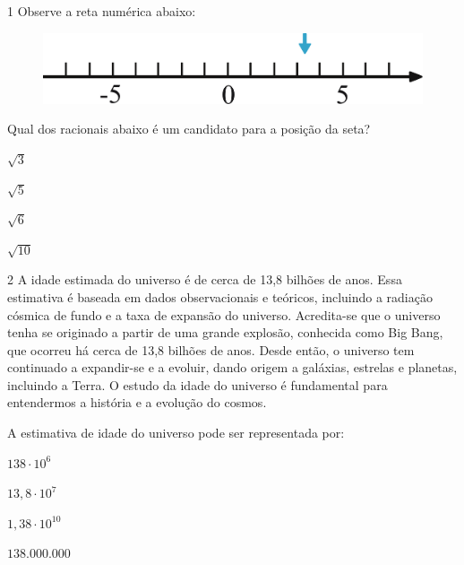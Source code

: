 
\num{1} Observe a reta numérica abaixo:

\begin{figure}[htpb!]
\centering
\includegraphics[width=\textwidth]{./ilustras-mat/Simulado_2-atividade_1.png}
\end{figure}

Qual dos racionais abaixo é um candidato para a posição da seta?


\begin{escolha}

  \item $\sqrt{3}$

  \item $\sqrt{5}$

  \item $\sqrt{6}$

  \item $\sqrt{10}$


\end{escolha}


\num{2} A idade estimada do universo é de cerca de 13,8 bilhões de anos. Essa
estimativa é baseada em dados observacionais e teóricos, incluindo a
radiação cósmica de fundo e a taxa de expansão do universo.
Acredita-se que o universo tenha se originado a partir de uma grande
explosão, conhecida como Big Bang, que ocorreu há cerca de 13,8
bilhões de anos. Desde então, o universo tem continuado a expandir-se
e a evoluir, dando origem a galáxias, estrelas e planetas, incluindo a
Terra. O estudo da idade do universo é fundamental para entendermos a
história e a evolução do cosmos.

A estimativa de idade do universo pode ser representada por:

\begin{escolha}

\item $138 \cdot 10^{6}$

\item $13,8 \cdot 10^{7}$

\item $1,38 \cdot 10^{10}$

\item $138.000.000$

\end{escolha}


